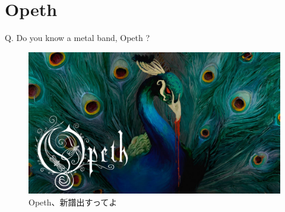 \section{Opeth}
\begin{frame}
	\frametitlesec
	Q. Do you know a metal band, {\theking{}Opeth} ?

	\pause{}\zw

	\begin{figure}
		\centering
		\includegraphics[height=.4\textheight]{img/opeth_newalbum.png}
		\caption{Opeth、新譜出すってよ}
	\end{figure}
\end{frame}


